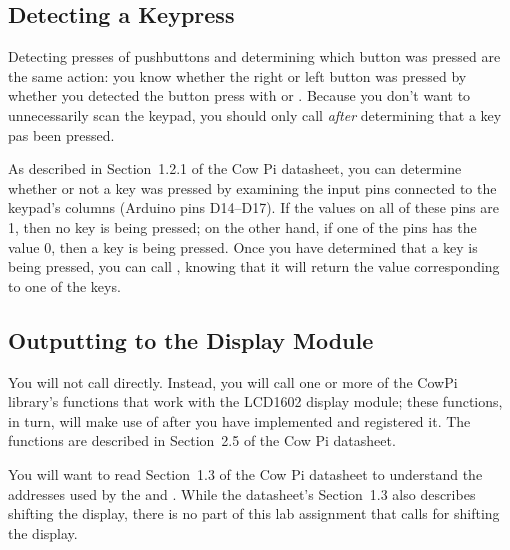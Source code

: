 \subsection{Detecting a Keypress}

Detecting presses of pushbuttons and determining which button was pressed are the same action: you know whether the right or left button was pressed by whether you detected the button press with  or .
Because you don't want to unnecessarily scan the keypad, you should only call  \textit{after} determining that a key pas been pressed.

As described in Section~1.2.1 of the Cow Pi datasheet, you can determine whether or not a key was pressed by examining the input pins connected to the keypad's columns (Arduino pins D14--D17).
If the values on all of these pins are 1, then no key is being pressed;
on the other hand, if one of the pins has the value 0, then a key is being pressed.
Once you have determined that a key is being pressed, you can call , knowing that it will return the value corresponding to one of the keys.


\subsection{Outputting to the Display Module}

You will not call  directly.
Instead, you will call one or more of the CowPi library's functions that work with the LCD1602 display module; these functions, in turn, will make use of  after you have implemented and registered it.
The functions are described in Section~2.5 of the Cow Pi datasheet.

You will want to read Section~1.3 of the Cow Pi datasheet to understand the addresses used by the  and .
While the datasheet's Section~1.3 also describes shifting the display, there is no part of this lab assignment that calls for shifting the display.